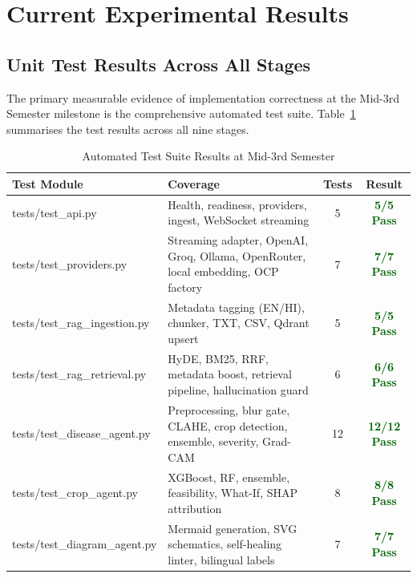 \documentclass[12pt,a4paper]{article}
\begin{document}
\section{Current Experimental Results}

\subsection{Unit Test Results Across All Stages}

The primary measurable evidence of implementation correctness at the Mid-3rd Semester milestone is the comprehensive automated test suite. Table~\ref{tab:tests} summarises the test results across all nine stages.

\begin{table}[!htbp]
\centering
\small
\setlength{\tabcolsep}{4pt}
\renewcommand{\arraystretch}{0.96}
\caption{Automated Test Suite Results at Mid-3rd Semester}
\label{tab:tests}
\begin{tabularx}{\textwidth}{|>{\raggedright\arraybackslash}p{5.1cm}|>{\raggedright\arraybackslash}X|c|c|}
\hline
\textbf{Test Module} & \textbf{Coverage} & \textbf{Tests} & \textbf{Result} \\
\hline
tests/test\_api.py & Health, readiness, providers, ingest, WebSocket streaming & 5 & \textcolor{darkGreen}{\textbf{5/5 Pass}} \\
\hline
tests/test\_providers.py & Streaming adapter, OpenAI, Groq, Ollama, OpenRouter, local embedding, OCP factory & 7 & \textcolor{darkGreen}{\textbf{7/7 Pass}} \\
\hline
tests/test\_rag\_ingestion.py & Metadata tagging (EN/HI), chunker, TXT, CSV, Qdrant upsert & 5 & \textcolor{darkGreen}{\textbf{5/5 Pass}} \\
\hline
tests/test\_rag\_retrieval.py & HyDE, BM25, RRF, metadata boost, retrieval pipeline, hallucination guard & 6 & \textcolor{darkGreen}{\textbf{6/6 Pass}} \\
\hline
tests/test\_disease\_agent.py & Preprocessing, blur gate, CLAHE, crop detection, ensemble, severity, Grad-CAM & 12 & \textcolor{darkGreen}{\textbf{12/12 Pass}} \\
\hline
tests/test\_crop\_agent.py & XGBoost, RF, ensemble, feasibility, What-If, SHAP attribution & 8 & \textcolor{darkGreen}{\textbf{8/8 Pass}} \\
\hline
tests/test\_diagram\_agent.py & Mermaid generation, SVG schematics, self-healing linter, bilingual labels & 7 & \textcolor{darkGreen}{\textbf{7/7 Pass}} \\

\end{tabularx}
\end{table}
\end{document}
